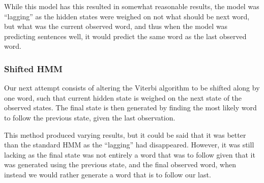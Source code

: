 \documentclass{article}
\begin{document}
While this model has this resulted in somewhat reasonable results, the model
was ``lagging'' as the hidden states were weighed on not what should be
next word, but what was the current observed word, and thus when the model was
predicting sentences well, it would predict the same word as the last observed
word.

\subsubsection{Shifted HMM}
Our next attempt consists of altering the Viterbi algorithm to be
shifted along by one word, such that current hidden state is weighed on the
next state of the observed states. The final state is then generated by
finding the most likely word to follow the previous state, given the last
observation.

This method produced varying results, but it could be said that it was better than the standard HMM as the ``lagging'' had disappeared. However, it was still lacking as the final state was not entirely a word that was to follow given that it was generated using the previous state, and the final observed word, when instead we would rather generate a word that is to follow
our last.
\end{document}
